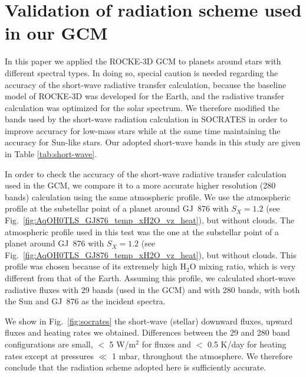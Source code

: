\documentclass[11pt,numberedappendix,twocolappendix,]{emulateapj}
\def\water{H$_2$O }
\begin{document}
\section{Validation of radiation scheme used in our GCM}
\label{ap:radiation}

In this paper we applied the ROCKE-3D GCM to planets around stars with different spectral types. 
In doing so, special caution is needed regarding the accuracy of the short-wave radiative transfer calculation, because the baseline model of ROCKE-3D was  developed for the Earth, and the radiative transfer calculation was optimized for the solar spectrum. 
We therefore modified the bands used by the short-wave radiation calculation in SOCRATES in order to improve accuracy for low-mass stars while at the same time maintaining the accuracy for Sun-like stars.
Our adopted short-wave bands in this study are given in Table \ref{tab:short-wave}.

In order to check the accuracy of the short-wave radiative transfer calculation used in the GCM, we compare it to a more accurate higher resolution (280 bands) calculation using the same atmospheric profile. 
We use the atmospheric profile at the substellar point of a planet around GJ~876 with $S_X=1.2$ (see Fig.~\ref{fig:AqOH0TLS_GJ876_temp_xH2O_vz_heat}), but without clouds.
The atmospheric profile used in this test was the one at the substellar point of a planet around GJ~876 with $S_X=1.2$ (see Fig.~\ref{fig:AqOH0TLS_GJ876_temp_xH2O_vz_heat}), but without clouds. 
This profile was chosen because of its extremely high \water mixing ratio, which is very different from that of the Earth. 
Assuming this profile, we calculated short-wave radiative fluxes with 29 bands (used in the GCM) and with 280 bands, with both the Sun and GJ~876 as the incident spectra.

We show in Fig.~\ref{fig:socrates} the short-wave (stellar) downward fluxes, upward fluxes and heating rates we obtained.
Differences between the 29 and 280 band configurations are small, $<$ 5 W/m$^2$ for fluxes and $<$ 0.5 K/day for heating rates except at pressures $\ll$ 1 mbar, throughout the atmosphere. We therefore conclude that the radiation scheme adopted here is sufficiently accurate.
\end{document}
